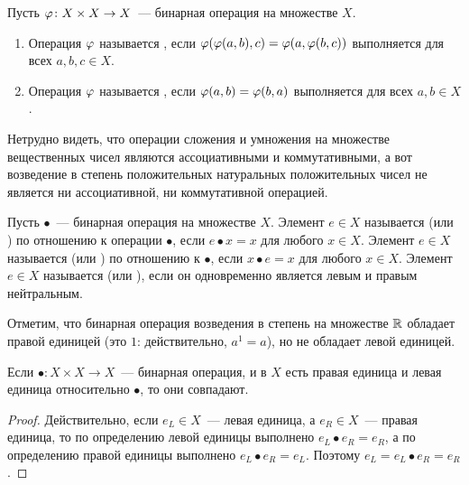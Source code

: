 \begin{definition}
Пусть $\varphi\colon X\times X\to X$~--- бинарная операция на множестве $X$.
\begin{enumerate}
\item Операция $\varphi$ называется
, если
$\varphi(\varphi(a,b),c)=\varphi(a,\varphi(b,c))$ выполняется для всех
$a,b,c\in X$.
\item Операция $\varphi$ называется
  ,
  если
  $\varphi(a,b)=\varphi(b,a)$ выполняется для всех $a,b\in X$.
\end{enumerate} 
\end{definition}
Нетрудно видеть, что операции сложения и умножения на множестве
вещественных чисел являются ассоциативными и коммутативными, а вот
возведение в степень
положительных натуральных положительных чисел не является ни
ассоциативной, ни коммутативной операцией.

\begin{definition}
Пусть $\bullet$~--- бинарная операция на множестве $X$. 
Элемент $e\in X$ называется
(или ) по отношению к операции
$\bullet$, если $e\bullet x = x$ для любого $x\in X$. Элемент $e\in X$
называется
 (или
) по
отношению к $\bullet$, если
$x\bullet e = x$ для любого $x\in X$. Элемент $e\in X$ называется
 (или
), если он одновременно является
левым и правым нейтральным.
\end{definition}

Отметим, что бинарная операция возведения в степень на множестве
$\mathbb R$ обладает правой единицей (это $1$: действительно, $a^1 = a$),
но не обладает левой единицей.

\begin{lemma}
Если $\bullet\colon X\times X\to X$~--- бинарная операция,
и в $X$ есть правая единица и левая единица относительно
$\bullet$, то они совпадают.
\end{lemma}
\begin{proof}
Действительно, если $e_L\in X$~--- левая единица, а $e_R\in X$~---
правая единица, то по определению левой единицы выполнено $e_L\bullet
e_R = e_R$, а по определению правой единицы выполнено $e_L\bullet e_R
= e_L$. Поэтому
$e_L = e_L\bullet e_R = e_R$.
\end{proof}


